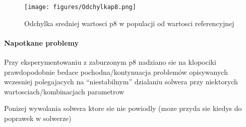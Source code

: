 \documentclass[]{article}
\let\oldparagraph\paragraph
\renewcommand{\paragraph}[1]{\oldparagraph{#1}\mbox{}}
\begin{document}
\begin{figure}[htbp]
\centering
\texttt{[image: figures/Odchylkap8.png]}
\caption{Odchylka sredniej wartosci p8 w populacji od wartosci
referencyjnej}
\end{figure}

\paragraph{Napotkane problemy}\label{napotkane-problemy-1}

Przy eksperymentowaniu z zaburzonym p8 nadziano sie na klopociki
prawdopodobnie bedace pochodna/kontynuacja problemów opisywanych
wczesniej polegajacych na ``niestabilnym'' dzialaniu solwera przy
niektorych wartosciach/kombinacjach parametrow

Ponizej wywolania solwera ktore sie nie powiodly (moze przyda sie kiedys
do poprawek w solwerze)
\end{document}
